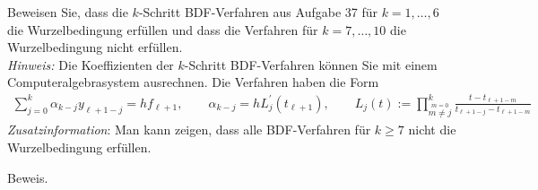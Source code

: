 \begin{exercise}
Beweisen Sie, dass die $k$-Schritt BDF-Verfahren aus Aufgabe 37 für $k = 1,\dots,6$
die Wurzelbedingung erfüllen und dass die Verfahren für $k = 7,\dots,10$
die Wurzelbedingung nicht erfüllen. \\
\textit{Hinweis:} Die Koeffizienten der $k$-Schritt BDF-Verfahren können Sie mit
einem Computeralgebrasystem ausrechnen. Die Verfahren haben die Form
\begin{align}
  \sum_{j= 0}^k \alpha_{k - j}y_{\ell + 1 - j} = hf_{\ell + 1}, \qquad
  \alpha_{k - j} = hL_j^{\prime}(t_{\ell + 1}), \qquad
  L_j(t) := \prod_{\stackrel{m = 0}{m \neq j}}^k \frac{t - t_{\ell + 1 -m}}{t_{\ell + 1 - j} - t_{\ell + 1 - m}}
\end{align}
\textit{Zusatzinformation}: Man kann zeigen, dass alle BDF-Verfahren für $k \geq 7$
nicht die Wurzelbedingung erfüllen.
\end{exercise}
\begin{solution}
Beweis.
\end{solution}
